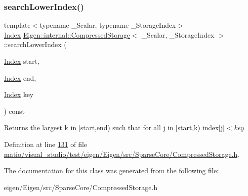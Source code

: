 \subsubsection{\texorpdfstring{search\+Lower\+Index()}{searchLowerIndex()}\hspace{0.1cm}{\footnotesize\ttfamily [4/4]}}
{\footnotesize\ttfamily template$<$typename \+\_\+\+Scalar, typename \+\_\+\+Storage\+Index$>$ \\
\hyperlink{namespace_eigen_a62e77e0933482dafde8fe197d9a2cfde}{Index} \hyperlink{class_eigen_1_1internal_1_1_compressed_storage}{Eigen\+::internal\+::\+Compressed\+Storage}$<$ \+\_\+\+Scalar, \+\_\+\+Storage\+Index $>$\+::search\+Lower\+Index (\begin{DoxyParamCaption}\item[{\hyperlink{namespace_eigen_a62e77e0933482dafde8fe197d9a2cfde}{Index}}]{start,  }\item[{\hyperlink{namespace_eigen_a62e77e0933482dafde8fe197d9a2cfde}{Index}}]{end,  }\item[{\hyperlink{namespace_eigen_a62e77e0933482dafde8fe197d9a2cfde}{Index}}]{key }\end{DoxyParamCaption}) const\hspace{0.3cm}{\ttfamily [inline]}}

\begin{DoxyReturn}{Returns}
the largest {\ttfamily k} in \mbox{[}start,end) such that for all {\ttfamily j} in \mbox{[}start,k) index\mbox{[}{\ttfamily j}\mbox{]}$<${\itshape key} 
\end{DoxyReturn}


Definition at line \hyperlink{matio_2visual__studio_2test_2eigen_2_eigen_2src_2_sparse_core_2_compressed_storage_8h_source_l00131}{131} of file \hyperlink{matio_2visual__studio_2test_2eigen_2_eigen_2src_2_sparse_core_2_compressed_storage_8h_source}{matio/visual\+\_\+studio/test/eigen/\+Eigen/src/\+Sparse\+Core/\+Compressed\+Storage.\+h}.



The documentation for this class was generated from the following file\+:\begin{DoxyCompactItemize}
\item 
eigen/\+Eigen/src/\+Sparse\+Core/\+Compressed\+Storage.\+h\end{DoxyCompactItemize}
